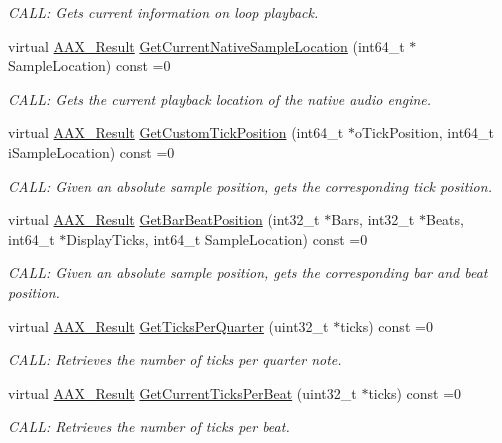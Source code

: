 \begin{DoxyCompactItemize}
\begin{DoxyCompactList}\small\item\em C\+A\+LL\+: Gets current information on loop playback. \end{DoxyCompactList}\item 
virtual \mbox{\hyperlink{a00392_a4d8f69a697df7f70c3a8e9b8ee130d2f}{A\+A\+X\+\_\+\+Result}} \mbox{\hyperlink{a01757_ac76e3960bbc6c5cdabee9d70ad98491c}{Get\+Current\+Native\+Sample\+Location}} (int64\+\_\+t $\ast$Sample\+Location) const =0
\begin{DoxyCompactList}\small\item\em C\+A\+LL\+: Gets the current playback location of the native audio engine. \end{DoxyCompactList}\item 
virtual \mbox{\hyperlink{a00392_a4d8f69a697df7f70c3a8e9b8ee130d2f}{A\+A\+X\+\_\+\+Result}} \mbox{\hyperlink{a01757_ac4fb339830e4868adbd40910b5b72dc8}{Get\+Custom\+Tick\+Position}} (int64\+\_\+t $\ast$o\+Tick\+Position, int64\+\_\+t i\+Sample\+Location) const =0
\begin{DoxyCompactList}\small\item\em C\+A\+LL\+: Given an absolute sample position, gets the corresponding tick position. \end{DoxyCompactList}\item 
virtual \mbox{\hyperlink{a00392_a4d8f69a697df7f70c3a8e9b8ee130d2f}{A\+A\+X\+\_\+\+Result}} \mbox{\hyperlink{a01757_a008d750ca8181f6b300c2ed66d3b76f9}{Get\+Bar\+Beat\+Position}} (int32\+\_\+t $\ast$Bars, int32\+\_\+t $\ast$Beats, int64\+\_\+t $\ast$Display\+Ticks, int64\+\_\+t Sample\+Location) const =0
\begin{DoxyCompactList}\small\item\em C\+A\+LL\+: Given an absolute sample position, gets the corresponding bar and beat position. \end{DoxyCompactList}\item 
virtual \mbox{\hyperlink{a00392_a4d8f69a697df7f70c3a8e9b8ee130d2f}{A\+A\+X\+\_\+\+Result}} \mbox{\hyperlink{a01757_a0f4c97187d6aea3bab6a83645a965805}{Get\+Ticks\+Per\+Quarter}} (uint32\+\_\+t $\ast$ticks) const =0
\begin{DoxyCompactList}\small\item\em C\+A\+LL\+: Retrieves the number of ticks per quarter note. \end{DoxyCompactList}\item 
virtual \mbox{\hyperlink{a00392_a4d8f69a697df7f70c3a8e9b8ee130d2f}{A\+A\+X\+\_\+\+Result}} \mbox{\hyperlink{a01757_a34ea33c3457f0480e99c47bde63f6a44}{Get\+Current\+Ticks\+Per\+Beat}} (uint32\+\_\+t $\ast$ticks) const =0
\begin{DoxyCompactList}\small\item\em C\+A\+LL\+: Retrieves the number of ticks per beat. \end{DoxyCompactList}\end{DoxyCompactItemize}


